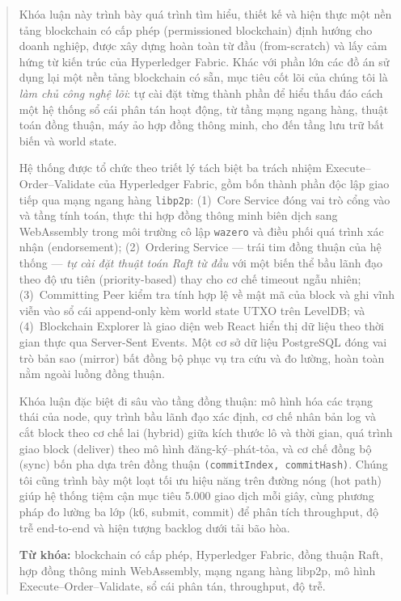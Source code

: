 \begin{abstract}

Khóa luận này trình bày quá trình tìm hiểu, thiết kế và hiện thực một
nền tảng blockchain có cấp phép (permissioned blockchain) định hướng cho doanh
nghiệp, được xây dựng hoàn toàn từ đầu (from-scratch) và lấy cảm hứng từ kiến
trúc của Hyperledger Fabric. Khác với phần lớn các đồ án sử dụng lại một nền
tảng blockchain có sẵn, mục tiêu cốt lõi của chúng tôi là \textit{làm chủ công
nghệ lõi}: tự cài đặt từng thành phần để hiểu thấu đáo cách một hệ thống sổ cái
phân tán hoạt động, từ tầng mạng ngang hàng, thuật toán đồng thuận, máy ảo hợp
đồng thông minh, cho đến tầng lưu trữ bất biến và world state.

Hệ thống được tổ chức theo triết lý tách biệt ba trách nhiệm
Execute--Order--Validate của Hyperledger Fabric, gồm bốn thành phần độc
lập giao tiếp qua mạng ngang hàng \texttt{libp2p}: (1)~Core Service
đóng vai trò cổng vào và tầng tính toán, thực thi hợp đồng thông minh biên dịch
sang WebAssembly trong môi trường cô lập \texttt{wazero} và điều phối quá trình
xác nhận (endorsement); (2)~Ordering Service --- trái tim đồng thuận
của hệ thống --- \textit{tự cài đặt thuật toán Raft từ đầu} với một biến thể bầu
lãnh đạo theo độ ưu tiên (priority-based) thay cho cơ chế timeout ngẫu nhiên;
(3)~Committing Peer kiểm tra tính hợp lệ về mật mã của block và ghi
vĩnh viễn vào sổ cái append-only kèm world state UTXO trên LevelDB; và
(4)~Blockchain Explorer là giao diện web React hiển thị dữ liệu theo
thời gian thực qua Server-Sent Events. Một cơ sở dữ liệu PostgreSQL đóng vai trò
bản sao (mirror) bất đồng bộ phục vụ tra cứu và đo lường, hoàn toàn nằm ngoài
luồng đồng thuận.

Khóa luận đặc biệt đi sâu vào tầng đồng thuận: mô hình hóa các trạng thái của
node, quy trình bầu lãnh đạo xác định, cơ chế nhân bản log và cắt block theo cơ
chế lai (hybrid) giữa kích thước lô và thời gian, quá trình giao block (deliver)
theo mô hình đăng-ký--phát-tỏa, và cơ chế đồng bộ (sync) bốn pha dựa trên đồng
thuận \texttt{(commitIndex, commitHash)}. Chúng tôi cũng trình bày một loạt tối
ưu hiệu năng trên đường nóng (hot path) giúp hệ thống tiệm cận mục tiêu
5.000 giao dịch mỗi giây, cùng phương pháp đo lường ba lớp (k6, submit,
commit) để phân tích throughput, độ trễ end-to-end và hiện tượng backlog dưới
tải bão hòa.

\vspace{0.4cm}
\noindent\textbf{Từ khóa:} blockchain có cấp phép, Hyperledger Fabric, đồng
thuận Raft, hợp đồng thông minh WebAssembly, mạng ngang hàng libp2p, mô hình
Execute--Order--Validate, sổ cái phân tán, throughput, độ trễ.

\end{abstract}
